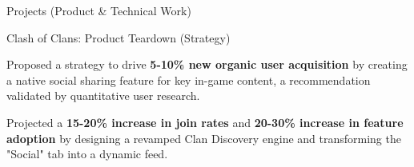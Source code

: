\documentclass{resume} %
\begin{document}
\begin{rSection}{Projects (Product \& Technical Work) \vspace{.1em}}
\begin{rSubsection}{Clash of Clans: Product Teardown (Strategy)}{}{}{}
\begin{itemize}[left=-1.5em, labelsep=.1cm, labelwidth=.2cm, itemsep=0.0em]
{\item Proposed a strategy to drive \textbf{5-10\% new organic user acquisition} by creating a native social sharing feature for key in-game content, a recommendation validated by quantitative user research.}
{\item Projected a \textbf{15-20\% increase in join rates} and \textbf{20-30\% increase in feature adoption} by designing a revamped Clan Discovery engine and transforming the "Social" tab into a dynamic feed.}
\end{itemize}
\end{rSubsection}

\end{rSection}
\end{document}
